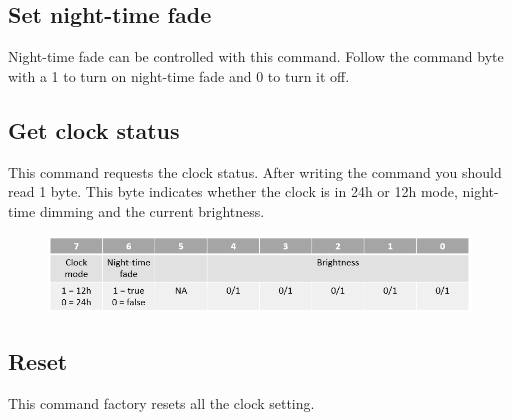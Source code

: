 \documentclass[12pt]{article}
\begin{document}
\subsection{Set night-time fade}
Night-time fade can be controlled with this command. Follow the command byte with a 1 to turn on night-time fade and 0 to turn it off.

\subsection{Get clock status}
This command requests the clock status. After writing the command you should read 1 byte. This byte indicates whether the clock is in 24h or 12h mode, night-time dimming and the current brightness.

\begin{figure}[!h]
\includegraphics[scale=0.5]{status}
\centering
\caption*{}
\label{fig:status}
\end{figure}


\subsection{Reset}
This command factory resets all the clock setting.
\end{document}
